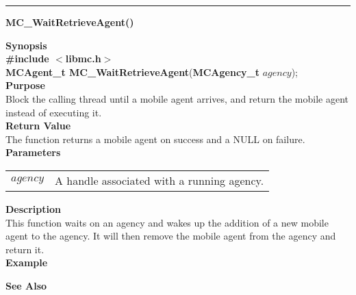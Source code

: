\noindent
\vspace{5pt}
\rule{6.5in}{0.015in}
\noindent
{\LARGE \bf MC\_WaitRetrieveAgent()}\\
{}

\noindent
{\bf Synopsis}\\
{\bf \#include $<$libmc.h$>$}\\
{\bf MCAgent\_t MC\_WaitRetrieveAgent}({\bf MCAgency\_t} $agency$);\\

\noindent
{\bf Purpose}\\
Block the calling thread until a mobile agent arrives, and return the mobile 
agent instead of executing it.\\

\noindent
{\bf Return Value}\\
The function returns a mobile agent on success and a NULL on failure.\\

\noindent
{\bf Parameters}
\vspace{-0.1in}
\begin{description}
\item               
\begin{tabular}{p{10 mm}p{145 mm}}
$agency$ & A handle associated with a running agency. 
\end{tabular}
\end{description}

\noindent
{\bf Description}\\
This function waits on an agency and wakes up the addition of a new mobile 
agent to the agency. 
It will then remove the mobile agent from the agency and return it.\\

\noindent
{\bf Example}\\
\noindent
{\footnotesize}

\noindent
{\bf See Also}\\

